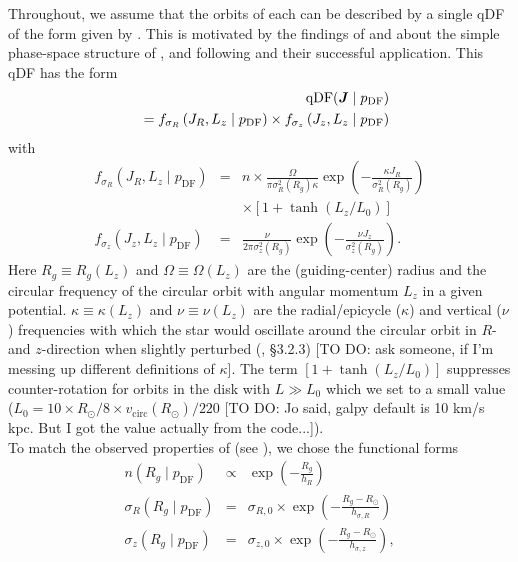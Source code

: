 Throughout, we assume that the orbits of each \MAP{} can be described by a single qDF of the form given by \citet{2011MNRAS.413.1889B}. This is motivated by the findings of \citet{bov12b,bov12c,2012ApJ...753..148B} and \citet{tin13} about the simple phase-space structure of \MAPs{}, and following \citet{bov13} and their successful application. This qDF has the form
\begin{eqnarray}
&&\text{qDF}(\boldsymbol{J} \mid p_\text{DF}) \nonumber\\
&&= f_{\sigma_R}\left(J_R,L_z \mid p_\text{DF}\right) \times f_{\sigma_z}\left(J_z,L_z \mid p_\text{DF}\right)\label{eq:df_general}\end{eqnarray}
with
\begin{eqnarray}
f_{\sigma_R}\left(J_R,L_z \mid p_\text{DF}\right) &=& n \times \frac{\Omega}{\pi\sigma_R^2(R_g) \kappa}\exp\left(-\frac{\kappa J_R}{\sigma_R^2(R_g)} \right) \nonumber\\
&& \times \left[1+\tanh\left(L_z/L_0\right) \right]\\
f_{\sigma_z}\left(J_z,L_z \mid p_\text{DF} \right) &=& \frac{\nu}{2 \pi \sigma_z^2(R_g)} \exp\left( -\frac{\nu J_z}{\sigma_z^2(R_g)} \right).
\end{eqnarray}
Here $R_g \equiv R_g(L_z)$ and $\Omega\equiv \Omega(L_z)$ are the (guiding-center) radius and the circular frequency of the circular orbit with angular momentum $L_z$ in a given potential. $\kappa\equiv \kappa(L_z)$ and $\nu\equiv \nu(L_z)$ are the radial/epicycle ($\kappa$) and vertical ($\nu$) frequencies with which the star would oscillate around the circular orbit in $R$- and $z$-direction when slightly perturbed (\citealt{2008gady.book.....B}, \S 3.2.3) [TO DO: ask someone, if I'm messing up different definitions of $\kappa$]. The term $\left[1+\tanh\left(L_z/L_0\right) \right]$ suppresses counter-rotation for orbits in the disk with $L \gg L_0$ which we set to a small value ($L_0 = 10 \times R_\odot/8 \times v_\text{circ}(R_\odot)/220$ [TO DO: Jo said, galpy default is 10 km/s kpc. But I got the value actually from the code...]).
\\To match the observed properties of \MAPs{} (see \citealt{bov12b,bov12c,2012ApJ...753..148B}), we chose the functional forms
\begin{eqnarray}
n(R_g \mid p_\text{DF}) &\propto& \exp\left(-\frac{R_g}{h_R} \right)\\
\sigma_R(R_g \mid p_\text{DF}) &=& \sigma_{R,0} \times \exp\left(- \frac{R_g-R_\odot}{h_{\sigma,R}} \right)\label{eq:sigmaRRg}\\
\sigma_z(R_g \mid p_\text{DF}) &=& \sigma_{z,0} \times \exp\left(- \frac{R_g-R_\odot}{h_{\sigma,z}} \right)\label{eq:sigmazRg},
\end{eqnarray}
